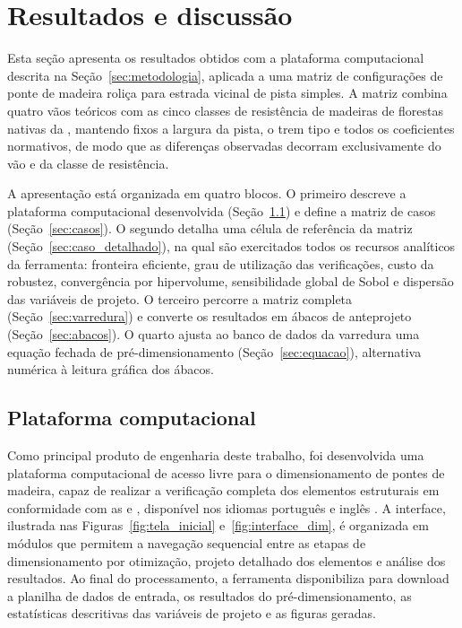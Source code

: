 \section{Resultados e discussão}\label{sec:resultados}

Esta seção apresenta os resultados obtidos com a plataforma computacional descrita na Seção~\ref{sec:metodologia}, aplicada a uma matriz de configurações de ponte de madeira roliça para estrada vicinal de pista simples.
A matriz combina quatro vãos teóricos com as cinco classes de resistência de madeiras de florestas nativas da \textcite{NBR7190-1:2022}, mantendo fixos a largura da pista, o trem tipo e todos os coeficientes normativos, de modo que as diferenças observadas decorram exclusivamente do vão e da classe de resistência.

A apresentação está organizada em quatro blocos.
O primeiro descreve a plataforma computacional desenvolvida (Seção~\ref{sec:plataforma}) e define a matriz de casos (Seção~\ref{sec:casos}).
O segundo detalha uma célula de referência da matriz (Seção~\ref{sec:caso_detalhado}), na qual são exercitados todos os recursos analíticos da ferramenta: fronteira eficiente, grau de utilização das verificações, custo da robustez, convergência por hipervolume, sensibilidade global de Sobol e dispersão das variáveis de projeto.
O terceiro percorre a matriz completa (Seção~\ref{sec:varredura}) e converte os resultados em ábacos de anteprojeto (Seção~\ref{sec:abacos}).
O quarto ajusta ao banco de dados da varredura uma equação fechada de pré-dimensionamento (Seção~\ref{sec:equacao}), alternativa numérica à leitura gráfica dos ábacos.


\subsection{Plataforma computacional}\label{sec:plataforma}

Como principal produto de engenharia deste trabalho, foi desenvolvida uma plataforma computacional de acesso livre para o dimensionamento de pontes de madeira, capaz de realizar a verificação completa dos elementos estruturais em conformidade com as \textcite{NBR7190-1:2022} e \textcite{nbr7188}, disponível nos idiomas português e inglês \parencite{ReliaBridge2026}.
A interface, ilustrada nas Figuras~\ref{fig:tela_inicial} e~\ref{fig:interface_dim}, é organizada em módulos que permitem a navegação sequencial entre as etapas de dimensionamento por otimização, projeto detalhado dos elementos e análise dos resultados.
Ao final do processamento, a ferramenta disponibiliza para download a planilha de dados de entrada, os resultados do pré-dimensionamento, as estatísticas descritivas das variáveis de projeto e as figuras geradas.

